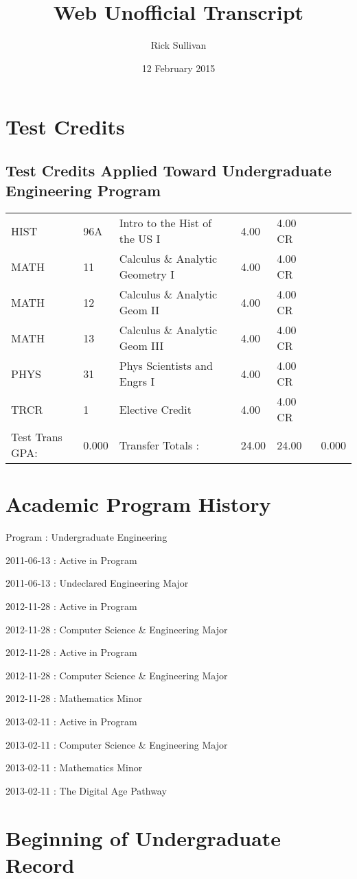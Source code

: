 \documentclass{scrartcl}\usepackage[T1]{fontenc}
\title{Web Unofficial Transcript}
\author{Rick Sullivan}
\date{12 February 2015}
\begin{document}
\maketitle

\section{Test Credits}
\subsection{Test Credits Applied Toward Undergraduate Engineering Program}
\begin{tabu}{ l  l  l  l  l  l }
HIST&96A&Intro to the Hist of the US I&4.00&4.00 CR&\\
MATH&11&Calculus \& Analytic Geometry I&4.00&4.00 CR&\\
MATH&12&Calculus \& Analytic Geom II&4.00&4.00 CR&\\
MATH&13&Calculus \& Analytic Geom III&4.00&4.00 CR&\\
PHYS&31&Phys Scientists and Engrs I&4.00&4.00 CR&\\
TRCR&1&Elective Credit&4.00&4.00 CR&\\
Test Trans GPA:&0.000&Transfer Totals :&24.00&24.00&0.000\\\end{tabu}
\section{Academic Program History}
Program	:	Undergraduate Engineering \

2011-06-13	:	Active in Program \

2011-06-13 : Undeclared Engineering Major \

2012-11-28	:	Active in Program \

2012-11-28 : Computer Science \& Engineering Major \

2012-11-28	:	Active in Program \

2012-11-28 : Computer Science \& Engineering Major \

2012-11-28 : Mathematics Minor \

2013-02-11	:	Active in Program \

2013-02-11 : Computer Science \& Engineering Major \

2013-02-11 : Mathematics Minor \

2013-02-11 : The Digital Age Pathway \

\section{Beginning of Undergraduate Record}
\end{document}
